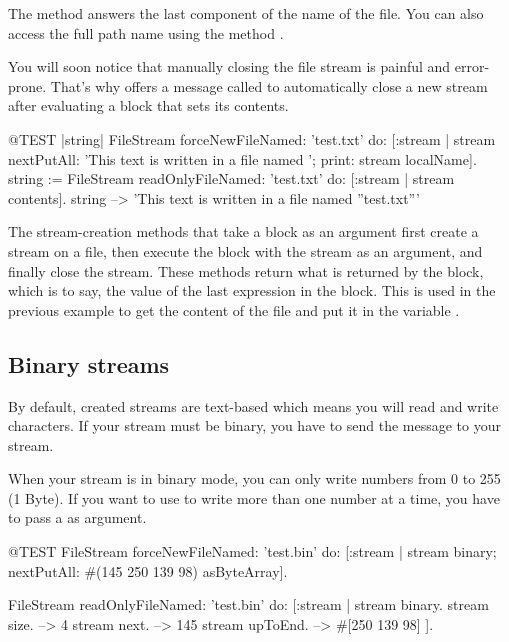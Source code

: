 \documentclass[a4paper,10pt,twoside]{book}
\begin{document}


The method  answers the last component of the name of the file. You can
also access the full path name using the method
.

You will soon notice that manually closing the file stream is
painful and error-prone. That's why  offers a message called  to
automatically close a new stream after evaluating a block that
sets its contents.

\begin{code}{@TEST |string|}
FileStream
    forceNewFileNamed: 'test.txt'
    do: [:stream |
        stream
            nextPutAll: 'This text is written in a file named ';
            print: stream localName].
string := FileStream
            readOnlyFileNamed: 'test.txt'
            do: [:stream | stream contents].
string --> 'This text is written in a file named ''test.txt'''
\end{code}

The stream-creation methods that take a block as an argument first
create a stream on a file, then execute the block with the stream
as an argument, and finally close the stream. These methods return what
is returned by the block, which is to say, the value of the last
expression in the block. This is used in the previous example to get
the content of the file and put it in the variable .

\subsection{Binary streams}

By default, created streams are text-based which means you will read
and write characters. If your stream must be binary, you have to send
the message  to your stream.

When your stream is in binary mode, you can only write numbers from 0
to 255 (1 Byte). If you want to use  to write more
than one number at a time, you have to pass a  as
argument.

\begin{code}{@TEST}
FileStream
  forceNewFileNamed: 'test.bin'
  do: [:stream |
          stream
            binary;
            nextPutAll: #(145 250 139 98) asByteArray].

FileStream
  readOnlyFileNamed: 'test.bin'
  do: [:stream |
          stream binary.
          stream size.         --> 4
          stream next.         --> 145
          stream upToEnd. --> #[250 139 98]
      ].
\end{code}
\end{document}
